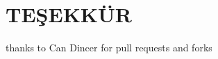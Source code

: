 \section*{\centering TEŞEKKÜR}
thanks to Can Dincer for pull requests and forks
\blindtext
\clearpage
